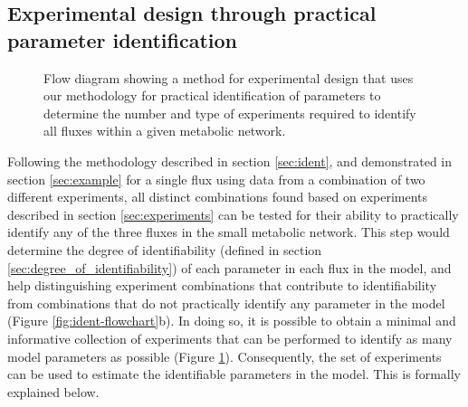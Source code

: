 \documentclass[10pt]{article}
\begin{document}
	\subsection{Experimental design through practical parameter identification}\label{sec:experimental_design}
	\begin{figure}[!tbhp]
		\caption{Flow diagram showing a method for experimental design that uses our methodology for practical identification of parameters to determine the number and type of experiments required to identify all fluxes within a given metabolic network.}\label{fig:ident-design}
	\end{figure}
	Following the methodology described in section \ref{sec:ident}, and demonstrated in section \ref{sec:example} for a single flux using data from a combination of two different experiments, all distinct combinations found based on experiments described in section \ref{sec:experiments} can be tested for their ability to practically identify any of the three fluxes in the small metabolic network. This step would determine the degree of identifiability (defined in section \ref{sec:degree_of_identifiability}) of each parameter in each flux in the model, and help distinguishing experiment combinations that contribute to identifiability from combinations that do not practically identify any parameter in the model (Figure \ref{fig:ident-flowchart}b). In doing so, it is possible to obtain a minimal and informative collection of experiments that can be performed to identify as many model parameters as possible (Figure \ref{fig:ident-design}). Consequently, the set of experiments can be used to estimate the identifiable parameters in the model. This is formally explained below.
	
\end{document}
